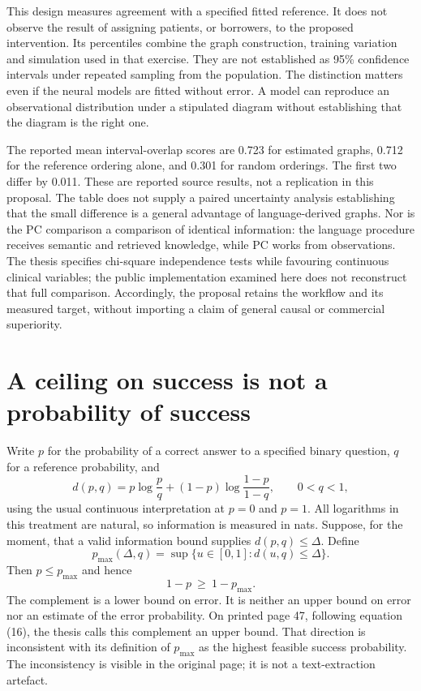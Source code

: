 This design measures agreement with a specified fitted reference. It does
not observe the result of assigning patients, or borrowers, to the proposed
intervention. Its percentiles combine the graph construction, training
variation and simulation used in that exercise. They are not established as
95\% confidence intervals under repeated sampling from the population.
The distinction matters even if the neural models are fitted without error.
A model can reproduce an observational distribution under a stipulated
diagram without establishing that the diagram is the right one.

The reported mean interval-overlap scores are 0.723 for estimated graphs,
0.712 for the reference ordering alone, and 0.301 for random orderings.
The first two differ by 0.011. These are reported source results, not a
replication in this proposal. The table does not supply a paired uncertainty
analysis establishing that the small difference is a general advantage of
language-derived graphs. Nor is the PC comparison a comparison of identical
information: the language procedure receives semantic and retrieved
knowledge, while PC works from observations. The thesis specifies
chi-square independence tests while favouring continuous clinical variables;
the public implementation examined here does not reconstruct that full
comparison. Accordingly, the proposal retains the workflow and its measured
target, without importing a claim of general causal or commercial superiority.
\citep[pp.~54--55, 77--79, Tables 10--11]{closure30molero}

\section{A ceiling on success is not a probability of success}

Write $p$ for the probability of a correct answer to a specified binary
question, $q$ for a reference probability, and
\begin{equation}
 d(p,q)=p\log\frac{p}{q}+(1-p)\log\frac{1-p}{1-q},
 \qquad 0<q<1,
 \label{closure30:bernoulli-kl}
\end{equation}
using the usual continuous interpretation at $p=0$ and $p=1$. All logarithms
in this treatment are natural, so information is measured in nats. Suppose,
for the moment, that a valid information bound supplies
$d(p,q)\leq\Delta$. Define
\begin{equation}
 p_{\max}(\Delta,q)=\sup\{u\in[0,1]:d(u,q)\leq\Delta\}.
 \label{closure30:success-cap}
\end{equation}
Then $p\leq p_{\max}$ and hence
\begin{equation}
 1-p\ \geq\ 1-p_{\max}.
 \label{closure30:error-floor}
\end{equation}
The complement is a lower bound on error. It is neither an upper bound on
error nor an estimate of the error probability. On printed page 47, following
equation (16), the thesis calls this complement an upper bound. That direction
is inconsistent with its definition of $p_{\max}$ as the highest feasible
success probability. The inconsistency is visible in the original page;
it is not a text-extraction artefact.
\citep[p.~47, equations (15)--(16)]{closure30molero}

